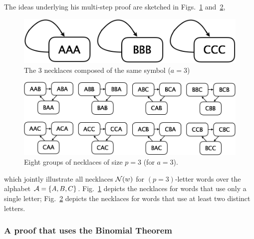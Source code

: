 The ideas underlying his multi-step proof are sketched in Figs.~\ref{fig:necklace3} and~\ref{fig:necklace24},
\begin{figure}[htb]
\begin{center}
        \includegraphics[scale=0.3]{FiguresArithmetic/Necklace3.png}
        \caption{The 3 necklaces composed of the same symbol ($a=3$)}
        \label{fig:necklace3}
\end{center}
\end{figure}
\begin{figure}[htb]
\begin{center}
        \includegraphics[scale=0.25]{FiguresArithmetic/Necklace24.png}
        \caption{Eight groups of necklaces of size $p=3$ (for $a=3$).}
        \label{fig:necklace24}
\end{center}
\end{figure}
which jointly illustrate all necklaces $\mbox{$\cal N$}(w)$ for $(p=3)$-letter words over the alphabet $\mbox{$\cal A$} = \{ A,B,C \}$.  Fig.~\ref{fig:necklace3} depicts the necklaces for words that use only a single letter; Fig.~\ref{fig:necklace24} depicts the necklaces for words that use at least two distinct letters.

\subsubsection{A proof that uses the Binomial Theorem}
\label{sec:FTL-via-BinomialTheorem}

